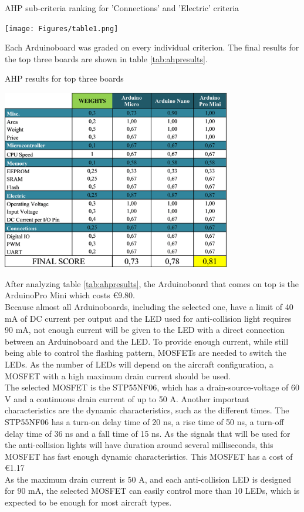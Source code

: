 \begin{table}[!htb]
  \centering
  \caption[AHP sub-criteria ranking for 'Connections' and 'Electric' criteria]{AHP sub-criteria ranking for 'Connections' and 'Electric' criteria}
  \texttt{[image: Figures/table1.png]}
  \label{tab:ranking}
\end{table}

Each Arduino\texttrademark board was graded on every individual criterion. The final results for the top three boards are shown in table \ref{tab:ahpresults}.

\begin{table}[!htb]
  \centering
  \caption[AHP results for top three boards]{AHP results for top three boards}
  \includegraphics[width=0.75\textwidth]{Figures/ahpresults.png}
  \label{tab:ahpresults}
\end{table}

After analyzing table \ref{tab:ahpresults}, the Arduino\texttrademark board that comes on top is the Arduino\texttrademark Pro Mini which costs \euro{9.80}.\\

Because almost all Arduino\texttrademark boards, including the selected one, have a limit of 40 mA of DC current per output and the LED used for anti-collision light requires 90 mA, not enough current will be given to the LED with a direct connection between an Arduino\texttrademark board and the LED. To provide enough current, while still being able to control the flashing pattern, MOSFETs are needed to switch the LEDs. As the number of LEDs will depend on the aircraft configuration, a MOSFET with a high maximum drain current should be used.\\
The selected MOSFET is the STP55NF06, which has a drain-source-voltage of 60 V and a continuous drain current of up to 50 A. Another important characteristics are the dynamic characteristics, such as the different times. The STP55NF06 has a turn-on delay time of 20 ns, a rise time of 50 ns, a turn-off delay time of 36 ns and a fall time of 15 ns. As the signals that will be used for the anti-collision lights will have duration around several milliseconds, this MOSFET has fast enough dynamic characteristics. This MOSFET has a cost of \euro{1.17}\\
As the maximum drain current is 50 A, and each anti-collision LED is designed for 90 mA, the selected MOSFET can easily control more than 10 LEDs, which is expected to be enough for most aircraft types.\\


